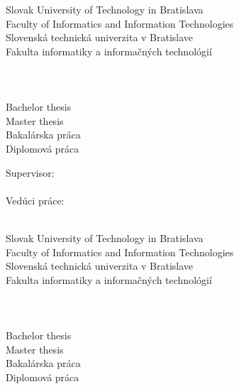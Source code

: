 \begin{center}
\thispagestyle{empty}
{
	{\Large Slovak University of Technology in Bratislava}\textbf{}\\
	{\Large Faculty of Informatics and Information Technologies}\textbf{}\\[\baselineskip]
}
{
	{\Large Slovenská technická univerzita v Bratislave}\textbf{}\\
	{\Large Fakulta informatiky a informačných technológií}\textbf{}\\[\baselineskip]
}
{\large \FIIT}\\
\vspace*{5cm}
{\Large \Author}\textbf{}\\[\baselineskip]
{\huge \Title}\textbf{}\\[\baselineskip]
{
	{
		{\large Bachelor thesis}\\
	}
	{
		{\large Master thesis}\\
	}
}
{
	{
		{\large Bakalárska práca}\\
	}
	{
		{\large Diplomová práca}\\
	}
}

\end{center}
\vspace*{6cm}
{
	Supervisor: \Supervisor \\\\
}
{
	Vedúci práce: \Supervisor \\\\
}
\Month \Year
\newpage
\begin{center}
\thispagestyle{empty}
{
	{\Large Slovak University of Technology in Bratislava}\textbf{}\\
	{\Large Faculty of Informatics and Information Technologies}\textbf{}\\[\baselineskip]
}
{
	{\Large Slovenská technická univerzita v Bratislave}\textbf{}\\
	{\Large Fakulta informatiky a informačných technológií}\textbf{}\\[\baselineskip]
}
{\large \FIIT}\\
\vspace*{5cm}
{\Large \Author}\textbf{}\\[\baselineskip]
{\huge \Title}\textbf{}\\[\baselineskip]
{
	{
		{\large Bachelor thesis}\\
	}
	{
		{\large Master thesis}\\
	}
}
{
	{
		{\large Bakalárska práca}\\
	}
	{
		{\large Diplomová práca}\\
	}
}
\end{center}
